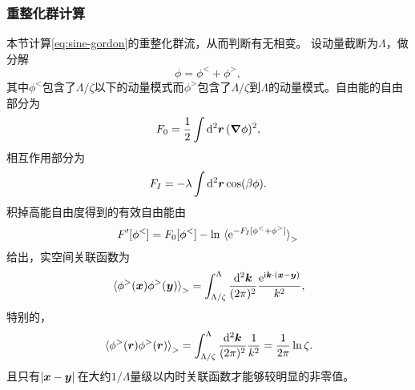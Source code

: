 \documentclass[hyperref, UTF8, a4paper]{ctexart}
\newcommand*{\ii}{\mathrm{i}}
\newcommand*{\ee}{\mathrm{e}}
\begin{document}
\subsubsection{重整化群计算}

本节计算\eqref{eq:sine-gordon}的重整化群流，从而判断有无相变。
设动量截断为$\Lambda$，做分解
\[
    \phi = \phi^< + \phi^>,
\]
其中$\phi^<$包含了$\Lambda/\zeta$以下的动量模式而$\phi^>$包含了$\Lambda/\zeta$到$\Lambda$的动量模式。自由能的自由部分为
\[
    F_0 = \frac{1}{2} \int \dd[2]{\vb*{r}} (\grad{\phi})^2,
\]
相互作用部分为
\[
    F_I = - \lambda \int \dd[2]{\vb*{r}} \cos(\beta \phi).
\]
积掉高能自由度得到的有效自由能由
\[
    F'[\phi^<] = F_0[\phi^<] - \ln \expval*{\ee^{-F_I[\phi^< +  \phi^>]}}_>
\]
给出，实空间关联函数为
\[
    \expval*{\phi^>(\vb*{x}) \phi^>(\vb*{y})}_> = \int^\Lambda_{\Lambda/\zeta} \frac{\dd[2]{\vb*{k}}}{(2\pi)^2} \frac{\ee^{\ii \vb*{k} \cdot (\vb*{x} - \vb*{y})}}{k^2},
\]
特别的，
\[
    \expval*{\phi^>(\vb*{r}) \phi^>(\vb*{r})}_> = \int_{\Lambda/\zeta}^\Lambda \frac{\dd[2]{\vb*{k}}}{(2\pi)^2} \frac{1}{k^2} = \frac{1}{2\pi} \ln \zeta.
\]
且只有$\abs*{\vb*{x} - \vb*{y}}$在大约$1/\Lambda$量级以内时关联函数才能够较明显的非零值。
\end{document}
